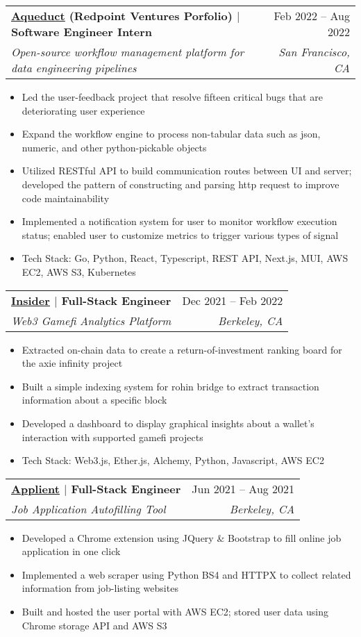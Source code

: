 \documentclass[letterpaper,11pt]{article}
\makeatletter
\newcommand{\resumeItem}[1]{
  \item\small{
    {#1 \vspace{-2pt}}
  }
}
\newcommand{\resumeSubheading}[4]{
  \vspace{-2pt}\item
    \begin{tabular*}{0.97\textwidth}[t]{l@{\extracolsep{\fill}}r}
      \textbf{#1} & #2 \\
      \textit{\small#3} & \textit{\small #4} \\
    \end{tabular*}\vspace{-7pt}
}
\newcommand{\resumeSubSubheading}[2]{
    \item
    \begin{tabular*}{0.97\textwidth}{l@{\extracolsep{\fill}}r}
      \textit{\small#1} & \textit{\small #2} \\
    \end{tabular*}\vspace{-7pt}
}
\newcommand{\resumeSubHeadingListEnd}{\end{itemize}}
\newcommand{\resumeItemListStart}{\begin{itemize}}
\newcommand{\resumeItemListEnd}{\end{itemize}\vspace{-5pt}}
\makeatother
\begin{document}
    \resumeSubheading
    {\href{https://www.aqueducthq.com/}{\underline{Aqueduct}} \small{(Redpoint Ventures Porfolio)} $|$ \small{Software Engineer Intern}}{Feb 2022 -- Aug 2022}
      {Open-source workflow management platform for data engineering pipelines}{San Francisco, CA}
      \resumeItemListStart
        \resumeItem{Led the user-feedback project that resolve fifteen critical bugs that are deteriorating user experience}
        \resumeItem{Expand the workflow engine to process non-tabular data such as json, numeric, and other python-pickable objects}
        \resumeItem{Utilized RESTful API to build communication routes between UI and server; developed the pattern of constructing and parsing http request to improve code maintainability}
        \resumeItem{Implemented a notification system for user to monitor workflow execution status; enabled user to customize metrics to trigger various types of signal}
        \resumeItem{Tech Stack: Go, Python, React, Typescript, REST API, Next.js, MUI, AWS EC2, AWS S3, Kubernetes}
      \resumeItemListEnd
      


    \resumeSubheading
    {\href{https://youtu.be/wMmpyEkLWdU}{\underline{Insider}} $|$ \small{Full-Stack Engineer}}{Dec 2021 -- Feb 2022}
      {Web3 Gamefi Analytics Platform}{Berkeley, CA}
      \resumeItemListStart
        \resumeItem{Extracted on-chain data to create a return-of-investment ranking board for the axie infinity project}
        \resumeItem{Built a simple indexing system for rohin bridge to extract transaction information about a specific block}
        \resumeItem{Developed a dashboard to display graphical insights about a wallet’s interaction with supported gamefi projects}
        \resumeItem{Tech Stack: Web3.js, Ether.js, Alchemy, Python, Javascript, AWS EC2}
      \resumeItemListEnd

      \resumeSubheading
      {\href{https://www.youtube.com/watch?v=CJtjjkdpU5M}{\underline{Applient}} $|$ \small{Full-Stack Engineer}}{Jun 2021 -- Aug 2021}
      {Job Application Autofilling Tool}{Berkeley, CA}
      \resumeItemListStart
        \resumeItem{Developed a Chrome extension using JQuery \& Bootstrap to fill online job application in one click}
        \resumeItem{Implemented a web scraper using Python BS4 and HTTPX to collect related information from job-listing websites}
        \resumeItem{Built and hosted the user portal with AWS EC2; stored user data using Chrome storage API and AWS S3}
      \resumeItemListEnd
\end{document}
